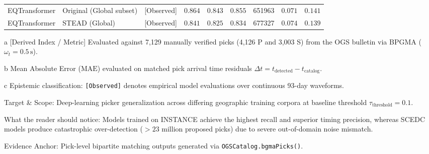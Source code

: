 \begin{table}[htbp]
\begin{threeparttable}
\begin{tabularx}{\linewidth}{l l c r r r r c c}
      EQTransformer & Original (Global subset) & [Observed] & $0.864$ & $0.843$ & $0.855$ & \num{651963} & $0.071$ & $0.141$ \\
      EQTransformer & STEAD (Global) & [Observed] & $0.841$ & $0.825$ & $0.834$ & \num{677327} & $0.074$ & $0.139$ \\
      \bottomrule
    \end{tabularx}
    \begin{tablenotes}[flushleft]
      \footnotesize
      \item[a] [Derived Index / Metric] Evaluated against 7,129 manually verified picks (4,126 P and 3,003 S) from the OGS bulletin via BPGMA ($\omega_t = 0.5\,\unit{\second}$).
      \item[b] Mean Absolute Error ($\mathrm{MAE}$) evaluated on matched pick arrival time residuals $\Delta t = t_{\mathrm{detected}} - t_{\mathrm{catalog}}$.
      \item[c] Epistemic classification: \texttt{[Observed]} denotes empirical model evaluations over continuous 93-day waveforms.
      \item Target \& Scope: Deep-learning picker generalization across differing geographic training corpora at baseline threshold $\tau_{\mathrm{threshold}} = 0.1$.
      \item What the reader should notice: Models trained on INSTANCE achieve the highest recall and superior timing precision, whereas SCEDC models produce catastrophic over-detection ($>23$ million proposed picks) due to severe out-of-domain noise mismatch.
      \item Evidence Anchor: Pick-level bipartite matching outputs generated via \texttt{OGSCatalog.bgmaPicks()}.
    \end{tablenotes}
  \end{threeparttable}
\end{table}


